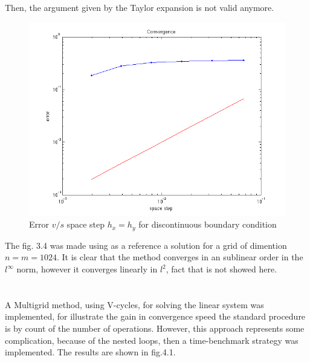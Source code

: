 \documentclass{article}
\numberwithin{equation}{section}
\begin{document}
\begin{enumerate}[label=(\alph*)]
        Then, the argument given by the Taylor expansion is not valid anymore.

        \begin{figure}[!htbp]
            \centering
            \includegraphics[width=15cm]{./p-set1/inform-4.png}
            \caption{Error $v/s$ space step $h_x = h_y$ for discontinuous boundary condition}
        \end{figure}

        The fig. 3.4 was made using as a reference a solution for a grid of dimention $n = m = 1024$. It is clear that the method converges in an sublinear order in the $l^{\infty}$ norm, however it converges linearly in $l^2$, fact that is not showed here.
    \end{enumerate}


    \section{}
    A Multigrid method, using V-cycles, for solving the linear system was implemented, for illustrate the gain in convergence speed the standard procedure is by count of the number of operations. However, this approach represents some complication, because of the nested loops, then a time-benchmark strategy was implemented.
    The results are shown in fig.4.1.
\end{document}
